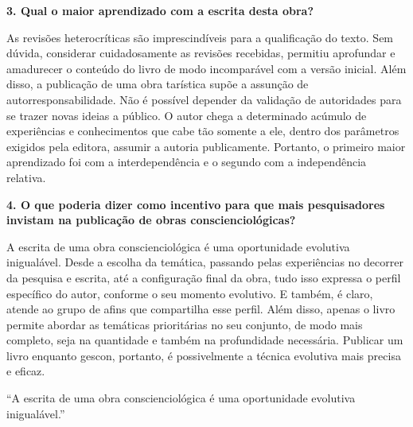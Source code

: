 \documentclass{gescons}
\begin{document}
\begin{multicols}{2}
\textbf{3.       Qual o maior aprendizado com a escrita desta obra?}

As revisões heterocríticas são imprescindíveis para a qualificação do texto. Sem dúvida, considerar cuidadosamente as revisões recebidas, permitiu aprofundar e amadurecer o conteúdo do livro de modo incomparável com a versão inicial. Além disso, a publicação de uma obra tarística supõe a assunção de autorresponsabilidade. Não é possível depender da validação de autoridades para se trazer novas ideias a público. O autor chega a determinado acúmulo de experiências e conhecimentos que cabe tão somente a ele, dentro dos parâmetros exigidos pela editora, assumir a autoria publicamente. Portanto, o primeiro maior aprendizado foi com a interdependência e o segundo com a independência relativa.


\textbf{4.       O que poderia dizer como incentivo para que mais pesquisadores invistam na publicação de obras conscienciológicas?}

A escrita de uma obra conscienciológica é uma oportunidade evolutiva inigualável. Desde a escolha da temática, passando pelas experiências no decorrer da pesquisa e escrita, até a configuração final da obra, tudo isso expressa o perfil específico do autor, conforme o seu momento evolutivo. E também, é claro, atende ao grupo de afins que compartilha esse perfil. Além disso, apenas o livro permite abordar as temáticas prioritárias no seu conjunto, de modo mais completo, seja na quantidade e também na profundidade necessária. Publicar um livro enquanto gescon, portanto, é possivelmente a técnica evolutiva mais precisa e eficaz.

\begin{pullquote}
``A escrita de uma obra conscienciológica é uma oportunidade evolutiva inigualável.''
\end{pullquote}

        
    \end{multicols}
\end{document}
